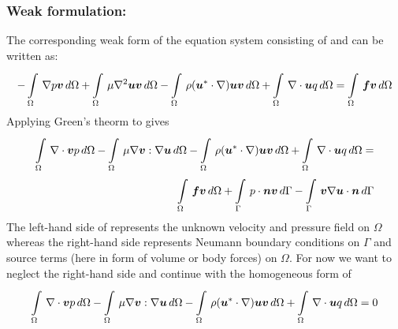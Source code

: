 \subsubsection{Weak formulation:}

The corresponding weak form of the equation system consisting of  and  can be written as:
\begin{equation}
  -\gint{\Omega}{}{\grad{p}\vect{v}}{\Omega}
  +\gint{\Omega}{}{\mu\laplacian{\vect{u}}\vect{v}}{\Omega}
  -\gint{\Omega}{}{\rho(\vect{u}^*\cdot\grad)\vect{u}\vect{v} }{\Omega}
  +\gint{\Omega}{}{\grad\cdot \vect{u}q}{\Omega}=
  \gint{\Omega}{}{\vect{f}\vect{v}}{\Omega}  
  \label{eqn:Stokesweakform}
\end{equation}
Applying Green's theorm to  gives
\begin{equation}
  \begin{split}
  \gint{\Omega}{}{\grad\cdot\vect{v}p}{\Omega}
  -\gint{\Omega}{}{\mu\grad\vect{v}:\grad\vect{u}}{\Omega}
  -\gint{\Omega}{}{\rho(\vect{u}^*\cdot\grad)\vect{u}\vect{v}}{\Omega}
  +\gint{\Omega}{}{\grad\cdot \vect{u}q}{\Omega}=\\
  \gint{\Omega}{}{\vect{f}\vect{v}}{\Omega}  
  +\gint{\Gamma}{}{\dotprod{p}{\vect{n}\vect{v}}}{\Gamma}
  -\gint{\Gamma}{}{\dotprod{\vect{v}\grad\vect{u}}{\vect{n}}}{\Gamma}
  \end{split}
  \label{eqn:Stokesweakform2}
\end{equation}
The left-hand side of  represents the unknown velocity and pressure field on $\Omega$ whereas the right-hand side represents Neumann boundary conditions on $\Gamma$ and source terms (here in form of volume or body forces) on $\Omega$. For now we want to neglect the right-hand side and continue with the homogeneous form of 
\begin{equation}
  \begin{split}
  \gint{\Omega}{}{\grad\cdot\vect{v}p}{\Omega}
  -\gint{\Omega}{}{\mu\grad\vect{v}:\grad\vect{u}}{\Omega}
  -\gint{\Omega}{}{\rho(\vect{u}^*\cdot\grad)\vect{u}\vect{v}}{\Omega}
  +\gint{\Omega}{}{\grad\cdot \vect{u}q}{\Omega}=0
  \end{split}
  \label{eqn:Stokesweakform3}
\end{equation}

